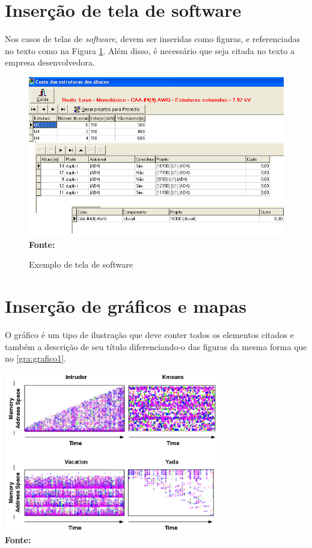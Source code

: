 \section{\esp Inserção de tela de software}

Nos casos de telas de \textit{software}, devem ser inseridas como figuras, e referenciadas no texto
como na Figura \ref{fig:tela1}. Além disso, é necessário que seja citada no texto a empresa desenvolvedora.

\begin{figure}[!ht]
	\centering	
	\caption[\hspace{0.1cm}Exemplo de tela de software.]{Exemplo de tela de software}
	\includegraphics[width=.8\textwidth]{figuras/tela1.png}
	\\\textbf{\footnotesize Fonte: }
	\label{fig:tela1}
\end{figure}

\section{\esp Inserção de gráficos e mapas}

O gráfico é um tipo de ilustração que deve conter todos os elementos citados e também a descrição de seu título
diferenciando-o das figuras da mesma forma que no \ref{gra:grafico1}. 

\begin{grafico}
	\centering	
	\includegraphics[width=0.7\textwidth]{figuras/access.png}
	\\\textbf{\footnotesize Fonte: }
	\label{gra:grafico1}
\end{grafico}

